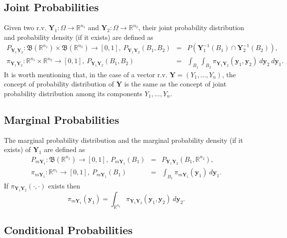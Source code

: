 \subsection{Joint Probabilities}

Given two r.v. $\mathbf{Y}_1:\Omega\rightarrow\mathbb{R}^{n_1}$ and $\mathbf{Y}_2:\Omega\rightarrow\mathbb{R}^{n_2}$,
their joint probability distribution and probability density (if it exists) are defined as
\begin{eqnarray*}
P_{\mathbf{Y}_1\mathbf{Y}_2}:\mathfrak{B}(\mathbb{R}^{n_1})\times\mathfrak{B}(\mathbb{R}^{n_2})\rightarrow [0,1],~
P_{\mathbf{Y}_1\mathbf{Y}_2}(B_1,B_2)
& = &
P(\mathbf{Y}_1^{-1}(B_1)\cap\mathbf{Y}_2^{-1}(B_2)), \\
\pi_{\mathbf{Y}_1\mathbf{Y}_2}:\mathbb{R}^{n_1}\times\mathbb{R}^{n_2}\rightarrow [0,1],~
P_{\mathbf{Y}_1\mathbf{Y}_2}(B_1,B_2)
& = &
\int_{B_1}\int_{B_2}\pi_{\mathbf{Y}_1\mathbf{Y}_2}(\mathbf{y}_1,\mathbf{y}_2)~d\mathbf{y}_2~d\mathbf{y}_1.
\end{eqnarray*}
It is worth mentioning that, in the case of a vector r.v. $\mathbf{Y}=(Y_1,\ldots,Y_n)$,
the concept of probability distribution of $\mathbf{Y}$ is the same as
the concept of joint probability distribution among its components $Y_1,\ldots,Y_n$.

\subsection{Marginal Probabilities}

The marginal probability distribution and the marginal probability density (if it exists) of $\mathbf{Y}_1$ are defined as
\begin{eqnarray*}
P_{m\mathbf{Y}_1}:\mathfrak{B}(\mathbb{R}^{n_1})\rightarrow [0,1],~
P_{m\mathbf{Y}_1}(B_1)
& = &
P_{\mathbf{Y}_1\mathbf{Y}_2}(B_1,\mathbb{R}^{n_2}), \\
\pi_{m\mathbf{Y}_1}:\mathbb{R}^{n_1}\rightarrow [0,1],~
P_{m\mathbf{Y}_1}(B_1)
& = &
\int_{B_1}\pi_{m\mathbf{Y}_1}(\mathbf{y}_1)~d\mathbf{y}_1.
\end{eqnarray*}
%
If $\pi_{\mathbf{Y}_1\mathbf{Y}_2}(\cdot,\cdot)$ exists then
\begin{equation*}
\pi_{m\mathbf{Y}_1}(\mathbf{y}_1)
=
\int_{\mathbb{R}^{n_2}}\pi_{\mathbf{Y}_1\mathbf{Y}_2}(\mathbf{y}_1,\mathbf{y}_2)~d\mathbf{y}_2.
\end{equation*}

\subsection{Conditional Probabilities}

